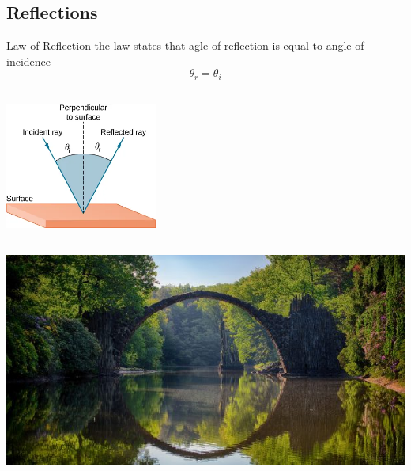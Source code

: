 \documentclass{beamer}
\begin{document}
\subsection{Reflections}
\begin{frame}
	\begin{block}{Law of Reflection}
		the law states that agle of reflection is equal to angle of incidence
		\begin{displaymath}
			\theta_{r} = \theta_{i}
		\end{displaymath}
	\end{block}
	\begin{center}
		\includegraphics[width=5cm, height=5cm]{2.png}
	\end{center}
\end{frame}

\begin{frame}
	\begin{center}
		\includegraphics[scale=0.7]{3.jpg}
	\end{center}
\end{frame}
\end{document}
